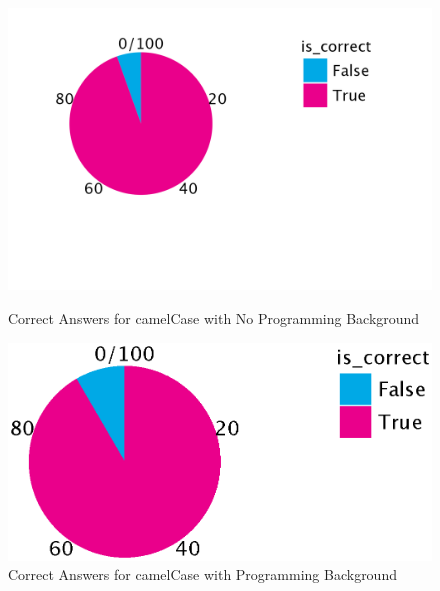\documentclass[unicode,11pt,a4paper,oneside,numbers=endperiod,openany]{scrartcl}
\begin{document}
\begin{figure}[h!]
    \centering
    \begin{minipage}{0.45\textwidth}
        \centering
        \includegraphics[width=\textwidth]{./figures/correct_camel_noback.png}
        \caption{Correct Answers for camelCase with No Programming Background}
        \label{fig:correct_camel_noback}
    \end{minipage}
    \hfill
    \begin{minipage}{0.45\textwidth}
        \centering
        \includegraphics[width=\textwidth]{./figures/correct_camel_background.eps}
        \caption{Correct Answers for camelCase with Programming Background}
        \label{fig:correct_camel_background}
    \end{minipage}
    
    \vspace{0.5cm} 
    

\end{figure}
\end{document}
